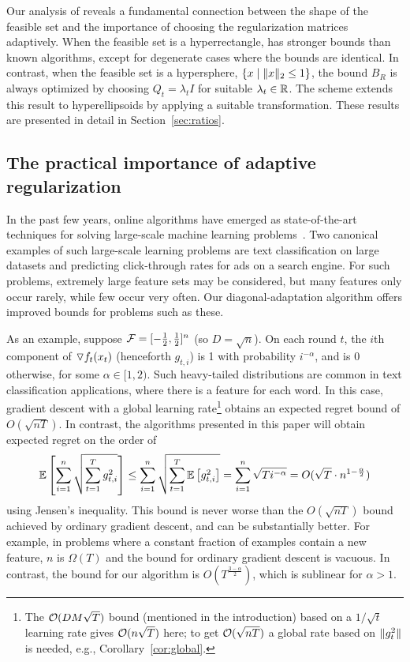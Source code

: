 Our analysis of \FTPRL reveals a fundamental connection between the
shape of the feasible set and the importance of choosing the
regularization matrices adaptively.  When the feasible set is a
hyperrectangle, \FTPRLdiag has stronger bounds than known algorithms,
except for degenerate cases where the bounds are identical.  In
contrast, when the feasible set is a hypersphere, $\left\{x
\mid \| x \|_2 \leq 1\right\}$, the bound $B_R$ is always optimized by
choosing $Q_t = \lambda_t I$ for suitable $\lambda_t \in \mathbb{R}$.  The
\FTPRLscale scheme extends this result to hyperellipsoids by applying
a suitable transformation.  These results are presented in detail in
Section~\ref{sec:ratios}.

\subsection{The practical importance of adaptive regularization}
\label{sec:motivation}

In the past few years, online algorithms have emerged as
state-of-the-art techniques for solving large-scale machine learning
problems~\cite{bottou08,zhang04}.  Two canonical
examples of such large-scale learning problems are text classification
on large datasets and predicting click-through rates for ads on a
search engine.  For such problems, extremely large feature sets may be
considered, but many features only occur rarely, while few occur very
often.  Our diagonal-adaptation algorithm offers improved bounds for
problems such as these.

As an example, suppose $\mathcal{F} = [-\frac{1}{2}, \frac{1}{2}]^n$ (so
$D=\sqrt{n}$).  On each round $t$, the $i$th component of $\triangledown f_t(x_t)$
(henceforth $g_{t, i}$) is 1 with
probability $i^{-\alpha}$, and is 0 otherwise, for some $\alpha \in
[1, 2)$.  Such heavy-tailed distributions are common in text
classification applications, where there is a feature for each word.
In this case, gradient descent with a global learning
rate\footnote{The $\mathcal{O}(DM \sqrt{T})$ bound (mentioned in the
introduction) based on a $1/\sqrt{t}$ learning rate gives $\mathcal{O}(n
\sqrt{T})$ here; to get $\mathcal{O}(\sqrt{nT})$ a global rate based on
$\| g_t^2 \|$ is needed, e.g., Corollary~\ref{cor:global}.}  obtains
an expected regret bound of $O(\sqrt {n T})$.  In contrast, the
algorithms presented in this paper will obtain expected regret on the order of
\[
\mathbb{E}\left[ \sum_{i=1}^n \sqrt { \sum_{t=1}^T g_{t, i}^2 } \right]
\le \sum_{i=1}^n \sqrt { \sum_{t=1}^T \mathbb{E}\left[  g_{t, i}^2  \right] }
= \sum_{i=1}^n \sqrt { T i^{-\alpha}  }
= O(\sqrt {T} \cdot n^{1 - \frac \alpha 2} )
\]
using Jensen's inequality.  This bound is never worse than the
$O(\sqrt {n T})$ bound achieved by ordinary gradient descent, and can
be substantially better.  For example, in problems where a constant
fraction of examples contain a new feature, $n$ is $\Omega(T)$ and the
bound for ordinary gradient descent is vacuous.  In contrast, the
bound for our algorithm is $O(T^{\frac {3-\alpha} {2}})$, which is
sublinear for $\alpha > 1$.

